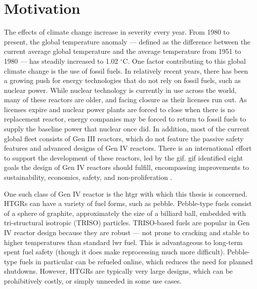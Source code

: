 \section{Motivation}

The effects of climate change increase in severity every year. From 1980 to present, the global temperature anomaly --- defined as the difference between the current average global temperature and the average temperature from 1951 to 1980 --- has steadily increased to 1.02 $^{\circ}$C.  One factor contributing to this global climate change is the use of fossil fuels.  In relatively recent years, there has been a growing push for energy technologies that do not rely on fossil fuels, such as nuclear power.  While nuclear technology is currently in use across the world, many of these reactors are older, and facing closure as their licenses run out.  As licenses expire and nuclear power plants are forced to close when there is no replacement reactor, energy companies may be forced to return to fossil fuels to supply the baseline power that nuclear once did.  In addition, most of the current global fleet consists of Gen III reactors, which do not feature the passive safety features and advanced designs of Gen IV reactors.  There is an international effort to support the development of these reactors, led by the \acrfull{gif}.  \acrshort{gif} identified eight goals the design of Gen IV reactors should fulfill, encompassing improvements to sustainability, economics, safety, and non-proliferation \cite{noauthor_home_nodate-1}.

One such class of Gen IV reactor is the \acrfull{htgr} with which this thesis is concerned.  HTGRs can have a variety of fuel forms, such as pebble.  Pebble-type fuels consist of a sphere of graphite, approximately the size of a billiard ball, embedded with tri-structural isotropic (TRISO) particles.  TRISO-based fuels are popular in Gen IV reactor design because they are robust --- not prone to cracking and stable to higher temperatures than standard \acrfull{lwr} fuel.  This is advantageous to long-term spent fuel safety (though it does make reprocessing much more difficult).  Pebble-type fuels in particular can be refueled online, which reduces the need for planned shutdowns.  However, HTGRs are typically very large designs, which can be prohibitively costly, or simply unneeded in some use cases.

